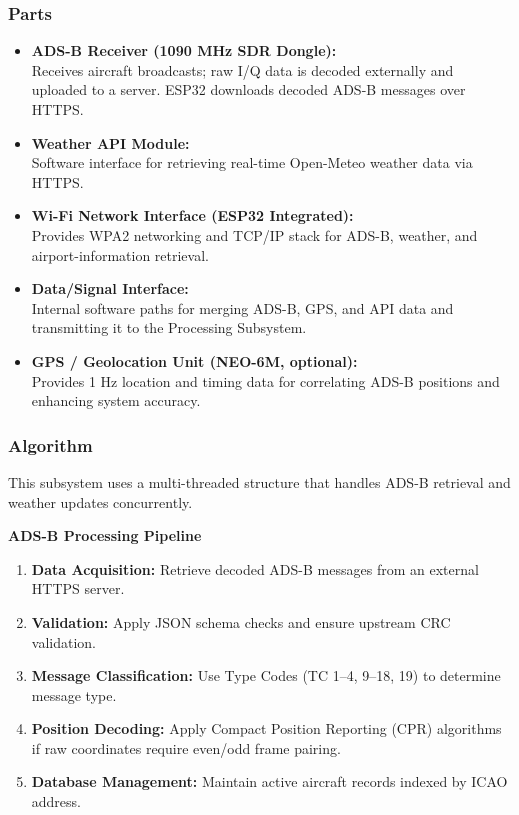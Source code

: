 \subsubsection{Parts}
\begin{itemize}
    \item \textbf{ADS-B Receiver (1090 MHz SDR Dongle):}\\
    Receives aircraft broadcasts; raw I/Q data is decoded externally and uploaded to a server. ESP32 downloads decoded ADS-B messages over HTTPS.

    \item \textbf{Weather API Module:}\\
    Software interface for retrieving real-time Open-Meteo weather data via HTTPS.

    \item \textbf{Wi-Fi Network Interface (ESP32 Integrated):}\\
    Provides WPA2 networking and TCP/IP stack for ADS-B, weather, and airport-information retrieval.

    \item \textbf{Data/Signal Interface:}\\
    Internal software paths for merging ADS-B, GPS, and API data and transmitting it to the Processing Subsystem.

    \item \textbf{GPS / Geolocation Unit (NEO-6M, optional):}\\
    Provides 1 Hz location and timing data for correlating ADS-B positions and enhancing system accuracy.
\end{itemize}

\subsubsection{Algorithm}

This subsystem uses a multi-threaded structure that handles ADS-B retrieval and weather updates concurrently.

\textbf{ADS-B Processing Pipeline}
\begin{enumerate}
    \item \textbf{Data Acquisition:} Retrieve decoded ADS-B messages from an external HTTPS server.
    \item \textbf{Validation:} Apply JSON schema checks and ensure upstream CRC validation.
    \item \textbf{Message Classification:} Use Type Codes (TC 1–4, 9–18, 19) to determine message type.
    \item \textbf{Position Decoding:} Apply Compact Position Reporting (CPR) algorithms if raw coordinates require even/odd frame pairing.
    \item \textbf{Database Management:} Maintain active aircraft records indexed by ICAO address.
\end{enumerate}


